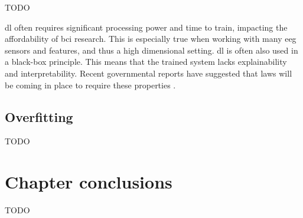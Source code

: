 TODO

\Gls{dl} often requires significant processing power and time to train, impacting the affordability of \gls{bci} research.
This is especially true when working with many \gls{eeg} sensors and features, and thus a high dimensional setting. 
\Gls{dl} is often also used in a black-box principle.
This means that the trained system lacks explainability and interpretability.
Recent governmental reports have suggested that laws will be coming in place to require these properties \citep{eu_ai_blackbox_report, explainable_ai_policy}.


\subsection{Overfitting}
\label{subsec:processing_signals_common_issues_overfitting}



TODO

\section{Chapter conclusions}
\label{sec:processing_signals_summary}

TODO